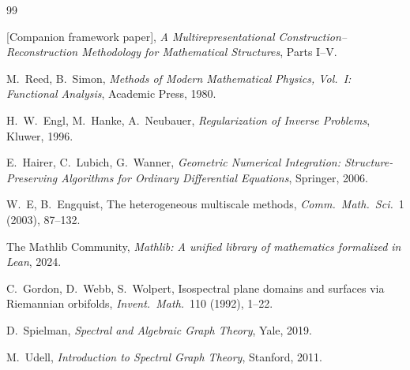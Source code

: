\documentclass[11pt,a4paper]{article}
\theoremstyle{definition}
\theoremstyle{plain}
\begin{document}
\begin{thebibliography}{99}

[Companion framework paper],
\emph{A Multirepresentational Construction--Reconstruction
Methodology for Mathematical Structures}, Parts I--V.

M.~Reed, B.~Simon,
\emph{Methods of Modern Mathematical Physics, Vol.~I: Functional
Analysis}, Academic Press, 1980.

H.~W.~Engl, M.~Hanke, A.~Neubauer,
\emph{Regularization of Inverse Problems}, Kluwer, 1996.

E.~Hairer, C.~Lubich, G.~Wanner,
\emph{Geometric Numerical Integration: Structure-Preserving
Algorithms for Ordinary Differential Equations}, Springer, 2006.

W.~E, B.~Engquist,
The heterogeneous multiscale methods,
\emph{Comm.~Math.~Sci.}~1 (2003), 87--132.

The Mathlib Community,
\emph{Mathlib: A unified library of mathematics formalized in Lean},
2024.

C.~Gordon, D.~Webb, S.~Wolpert,
Isospectral plane domains and surfaces via Riemannian orbifolds,
\emph{Invent.~Math.}~110 (1992), 1--22.

D.~Spielman,
\emph{Spectral and Algebraic Graph Theory}, Yale, 2019.

M.~Udell,
\emph{Introduction to Spectral Graph Theory}, Stanford, 2011.

\end{thebibliography}
\end{document}
